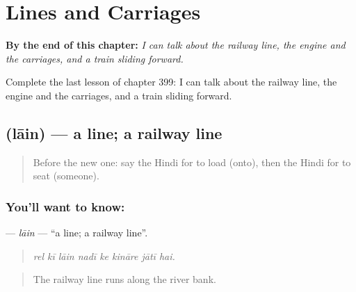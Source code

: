 
\chapter{Lines and Carriages}
\label{ch:hi-lines-and-carriages}

\begin{chapteropening}
\textbf{By the end of this chapter:} \emph{I can talk about the railway line, the engine and the carriages, and a train sliding forward.}

Complete the last lesson of chapter 399: I can talk about the railway line, the engine and the carriages, and a train sliding forward.
\end{chapteropening}

\section[\texorpdfstring{\hi{लाइन} (lāin)}{लाइन (lāin)}]{ (lāin) — a line; a railway line}

\label{lesson:HI-C399-lain}



\begin{quote}
Before the new one: say the Hindi for to load (onto), then the Hindi for to seat (someone).
\end{quote}

\subsection*{You'll want to know: }
\textbf{} — \emph{lāin} — \textquotedblleft{}a line; a railway line\textquotedblright{}.

\begin{quote}
       
\end{quote}

\begin{quote}
\emph{rel kī lāin nadī ke kināre jātī hai.}
\end{quote}

\begin{quote}
The railway line runs along the river bank.
\end{quote}

